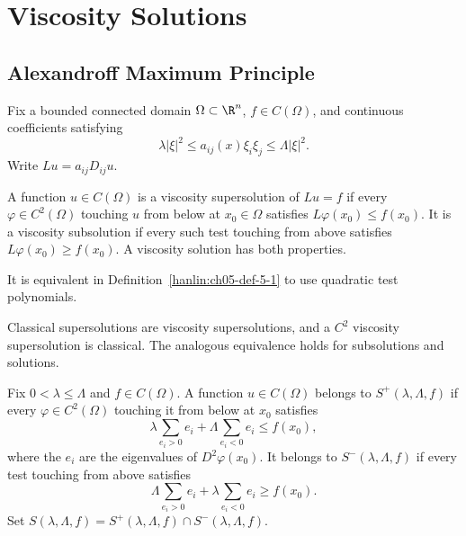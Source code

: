 \chapter{Viscosity Solutions}

\section{Alexandroff Maximum Principle}

Fix a bounded connected domain $\Omega\subset\R^n$, $f\in C(\Omega)$,
and continuous coefficients satisfying
\[
\lambda|\xi|^2\leq a_{ij}(x)\xi_i\xi_j\leq\Lambda|\xi|^2.
\]
Write $Lu=a_{ij}D_{ij}u$.

\begin{definition}\label{hanlin:ch05-def-5-1}
A function $u\in C(\Omega)$ is a viscosity supersolution of $Lu=f$ if
every $\varphi\in C^2(\Omega)$ touching $u$ from below at
$x_0\in\Omega$ satisfies $L\varphi(x_0)\leq f(x_0)$. It is a viscosity
subsolution if every such test touching from above satisfies
$L\varphi(x_0)\geq f(x_0)$. A viscosity solution has both properties.
\end{definition}

\begin{remark}\label{hanlin:ch05-rem-5-2}
It is equivalent in Definition~\ref{hanlin:ch05-def-5-1} to use quadratic
test polynomials.
\end{remark}

\begin{remark}\label{hanlin:ch05-rem-5-3}
Classical supersolutions are viscosity supersolutions, and a $C^2$ viscosity
supersolution is classical. The analogous equivalence holds for subsolutions
and solutions.
\end{remark}
\begin{definition}\label{hanlin:ch05-def-5-4}
Fix $0<\lambda\leq\Lambda$ and $f\in C(\Omega)$. A function
$u\in C(\Omega)$ belongs to $S^+(\lambda,\Lambda,f)$ if every
$\varphi\in C^2(\Omega)$ touching it from below at $x_0$ satisfies
\[
\lambda\sum_{e_i>0}e_i+\Lambda\sum_{e_i<0}e_i\leq f(x_0),
\]
where the $e_i$ are the eigenvalues of $D^2\varphi(x_0)$. It belongs to
$S^-(\lambda,\Lambda,f)$ if every test touching from above satisfies
\[
\Lambda\sum_{e_i>0}e_i+\lambda\sum_{e_i<0}e_i\geq f(x_0).
\]
Set $S(\lambda,\Lambda,f)=S^+(\lambda,\Lambda,f)\cap
S^-(\lambda,\Lambda,f)$.
\end{definition}




